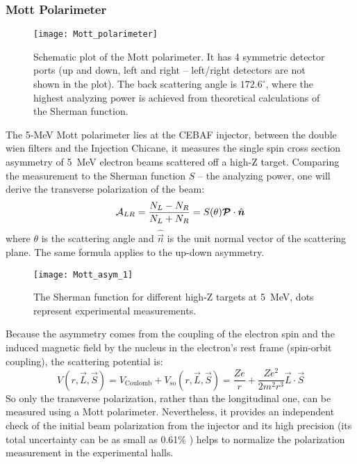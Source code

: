 \subsubsection{Mott Polarimeter}
\begin{figure}[!h]
    \centering
    \texttt{[image: Mott\_polarimeter]}
    \caption{Schematic plot of the Mott polarimeter. It has 4 symmetric detector
    ports (up and down, left and right -- left/right detectors are not shown in the plot). 
    The back scattering angle is $172.6^\circ$, where the highest analyzing power 
    is achieved from theoretical calculations of the Sherman function.
    \cite{PhysRevC.102.015501}}
\end{figure}
The 5-MeV Mott polarimeter lies at the CEBAF injector, between the double wien filters
and the Injection Chicane, it measures the single spin cross section asymmetry
of 5~MeV electron beams scattered off a high-Z target. Comparing the measurement
to the Sherman function $S$ \cite{PhysRev.103.1601} -- the analyzing power, one will 
derive the transverse polarization of the beam:
\begin{equation}
    \mathcal{A}_{LR} = \frac{N_L - N_R}{N_L + N_R} = S(\theta)\boldsymbol{\mathcal{P}}\cdot \hat{\boldsymbol{n}}
\end{equation}
where $\theta$ is the scattering angle and $\hat{\vec{n}}$ is the unit normal 
vector of the scattering plane. The same formula applies to the up-down asymmetry.
\begin{figure}
    \centering
    \texttt{[image: Mott\_asym\_1]}
    \caption{The Sherman function for different high-Z targets at 5~MeV, dots
    represent experimental measurements.}   %
\end{figure}
Because the asymmetry comes from the coupling of the electron spin and the induced
magnetic field by the nucleus in the electron's rest frame (spin-orbit coupling), 
the scattering potential is:
\begin{equation}
    V(r, \vec{L}, \vec{S}) = V_{\text{Coulomb}} + V_{\text{so}} (r, \vec{L}, \vec{S}) 
    = \frac{Ze}{r} + \frac{Ze^2}{2m^2r^3}\vec{L}\cdot \vec{S}
\end{equation}
So only the transverse polarization, rather than the longitudinal one, can be 
measured using a Mott polarimeter. Nevertheless, it provides an
independent check of the initial beam polarization from the injector and its high
precision (its total uncertainty can be as small as 0.61\% \cite{PhysRevC.102.015501}) 
helps to normalize the polarization measurement in the experimental halls.

